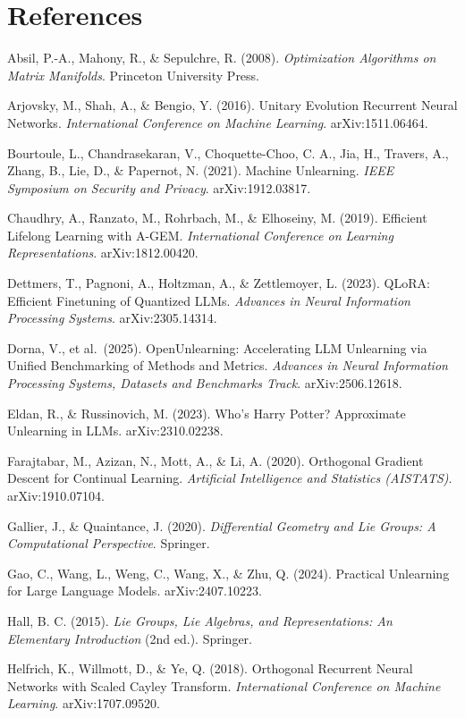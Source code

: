 \documentclass[
]{article}
\begin{document}
\section{References}\label{references}

Absil, P.-A., Mahony, R., \& Sepulchre, R. (2008). \emph{Optimization Algorithms on Matrix Manifolds}. Princeton University Press.

Arjovsky, M., Shah, A., \& Bengio, Y. (2016). Unitary Evolution Recurrent Neural Networks. \emph{International Conference on Machine Learning}. arXiv:1511.06464.

Bourtoule, L., Chandrasekaran, V., Choquette-Choo, C. A., Jia, H., Travers, A., Zhang, B., Lie, D., \& Papernot, N. (2021). Machine Unlearning. \emph{IEEE Symposium on Security and Privacy}. arXiv:1912.03817.

Chaudhry, A., Ranzato, M., Rohrbach, M., \& Elhoseiny, M. (2019). Efficient Lifelong Learning with A-GEM. \emph{International Conference on Learning Representations}. arXiv:1812.00420.

Dettmers, T., Pagnoni, A., Holtzman, A., \& Zettlemoyer, L. (2023). QLoRA: Efficient Finetuning of Quantized LLMs. \emph{Advances in Neural Information Processing Systems}. arXiv:2305.14314.

Dorna, V., et al.~(2025). OpenUnlearning: Accelerating LLM Unlearning via Unified Benchmarking of Methods and Metrics. \emph{Advances in Neural Information Processing Systems, Datasets and Benchmarks Track}. arXiv:2506.12618.

Eldan, R., \& Russinovich, M. (2023). Who's Harry Potter? Approximate Unlearning in LLMs. arXiv:2310.02238.

Farajtabar, M., Azizan, N., Mott, A., \& Li, A. (2020). Orthogonal Gradient Descent for Continual Learning. \emph{Artificial Intelligence and Statistics (AISTATS)}. arXiv:1910.07104.

Gallier, J., \& Quaintance, J. (2020). \emph{Differential Geometry and Lie Groups: A Computational Perspective}. Springer.

Gao, C., Wang, L., Weng, C., Wang, X., \& Zhu, Q. (2024). Practical Unlearning for Large Language Models. arXiv:2407.10223.

Hall, B. C. (2015). \emph{Lie Groups, Lie Algebras, and Representations: An Elementary Introduction} (2nd ed.). Springer.

Helfrich, K., Willmott, D., \& Ye, Q. (2018). Orthogonal Recurrent Neural Networks with Scaled Cayley Transform. \emph{International Conference on Machine Learning}. arXiv:1707.09520.
\end{document}
